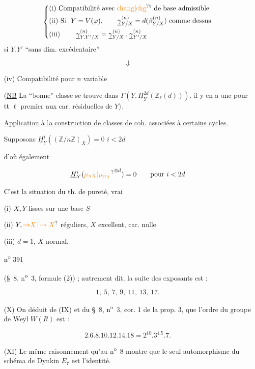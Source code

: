 \[
\left\{\begin{aligned}
&\text{(i) Compatibilité avec \unsure{chang|chg}\textsuperscript{t} de base admissible}\\
&\text{(ii) Si }\ Y=V(\varphi),\qquad \underline\gamma^{(n)}_{Y/X}=d(\beta^{(n)}_{Y/X})\ \text{comme dessus}\\
&\text{(iii) }\qquad \underline\gamma^{(n)}_{Y.Y'/X}=\underline\gamma^{(n)}_{Y/X}\mathbin{.}\underline\gamma^{(n)}_{Y'/X}
\end{aligned}\right.
\]
si $Y.Y'$ ``sans dim. excédentaire''

\[
\Downarrow
\]

(iv) Compatibilité pour $n$ variable

(\uline{NB} La ``bonne'' classe se trouve dans $\Gamma(Y,\underline H^{2d}_Y(\mathbb Z_\ell(d)))$, il y en a une pour tt $\ell$ premier aux car. résiduelles de $Y$).

\uline{Application à la construction de classes de coh. associées à certains cycles.}

Supposons $\underline H^i_Y((\mathbb Z/n\mathbb Z)_X)=0$   $i<2d$

d'où également

\[
\underline H^i_Y(\unsure{\mu_{nX}|\mu_{n_X}}^{\otimes d})=0\qquad\text{pour }i<2d
\]

C'est la situation du th. de pureté, vrai

(i) $X,Y$ lisses sur une base $S$

(ii) $Y,\unsure{\deleted{\to}X|\to X}$ réguliers, $X$ excellent, car. nulle

(iii) $d=1$, $X$ normal.

\hfill n\textsuperscript{o} 391

(\S~8, n\textsuperscript{o}~3, formule (2)) ; autrement dit, la suite des exposants est :

\[
1,\ 5,\ 7,\ 9,\ 11,\ 13,\ 17.
\]

(X) On déduit de (IX) et du \S~8, n\textsuperscript{o}~3, cor. 1 de la prop. 3, que l'ordre du groupe de Weyl $W(R)$ est :

\[
2.6.8.10.12.14.18=2^{10}.3^4.5.7.
\]

(XI) Le même raisonnement qu'au n\textsuperscript{o}~8 montre que le seul automorphisme du schéma de Dynkin $E_7$ est l'identité.

